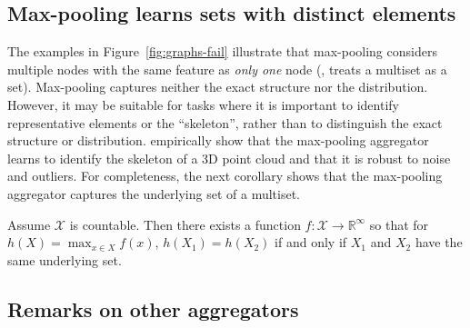 \subsection{Max-pooling learns sets with distinct elements}
The examples in Figure~\ref{fig:graphs-fail} illustrate that max-pooling considers multiple nodes with the same feature as \textit{only one} node (\ie, treats a multiset as a set). Max-pooling captures neither the exact structure nor the distribution. However, it may be suitable for tasks where it is important to identify representative elements or the ``skeleton'', rather than to distinguish the exact structure or distribution. \citet{qi2017pointnet} empirically show that the max-pooling aggregator learns to identify the skeleton of a 3D point cloud and that it is robust to noise and outliers. For completeness, the next corollary shows that the max-pooling aggregator captures the underlying set of a multiset.
%
 \vspace{0.03in}
\begin{corollary} \label{theorem:max-pooling}
Assume $\mathcal{X}$ is countable. Then there exists a function $f:\mathcal{X}\rightarrow \mathbb{R}^{\infty}$ so that for $h(X) =  \max_{x \in X} f(x)$, $h(X_1) = h(X_2)$ if and only if $X_1 $ and $X_2$ have the same underlying set.
\end{corollary}

\subsection{Remarks on other aggregators}


